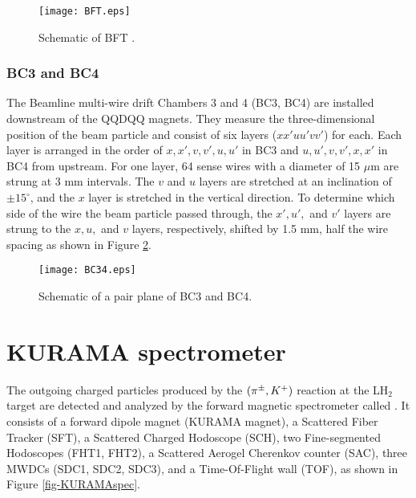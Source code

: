 \begin{figure}[!h]
 \begin{center}
   \texttt{[image: BFT.eps]}
   \caption{Schematic of BFT \cite{Honda-D}.}
   \label{fig-BFT}
 \end{center}
\end{figure}

%
\subsubsection{BC3 and BC4}
The Beamline multi-wire drift Chambers 3 and 4 (BC3, BC4) are installed downstream of the QQDQQ magnets. They measure the three-dimensional position of the beam particle and consist of six layers ($xx'uu'vv'$) for each. Each layer is arranged in the order of $x, x', v, v', u, u'$ in BC3 and $u, u', v, v', x, x'$ in BC4 from upstream. For one layer, 64 sense wires with a diameter of 15 $\mu$m are strung at 3 mm intervals. The $v$ and $u$ layers are stretched at an inclination of $\pm15^{\circ}$, and the $x$ layer is stretched in the vertical direction. To determine which side of the wire the beam particle passed through, the $x', u',$ and $v'$ layers are strung to the $x, u,$ and $v$ layers, respectively, shifted by 1.5 mm, half the wire spacing as shown in Figure \ref{fig-BC34}.

\begin{figure}[!h]
 \begin{center}
   \texttt{[image: BC34.eps]}
   \caption{Schematic of a pair plane of BC3 and BC4.}
   \label{fig-BC34}
 \end{center}
\end{figure}


\clearpage
\section{KURAMA spectrometer}
The outgoing charged particles produced by the $(\pi^{\pm},K^+)$ reaction at the LH$_2$ target are detected and analyzed by the forward magnetic spectrometer called . It consists of a forward dipole magnet (KURAMA magnet), a Scattered Fiber Tracker (SFT), a Scattered Charged Hodoscope (SCH), two Fine-segmented Hodoscopes (FHT1, FHT2), a Scattered Aerogel Cherenkov counter (SAC), three MWDCs (SDC1, SDC2, SDC3), and a Time-Of-Flight wall (TOF), as shown in Figure \ref{fig-KURAMAspec}.

